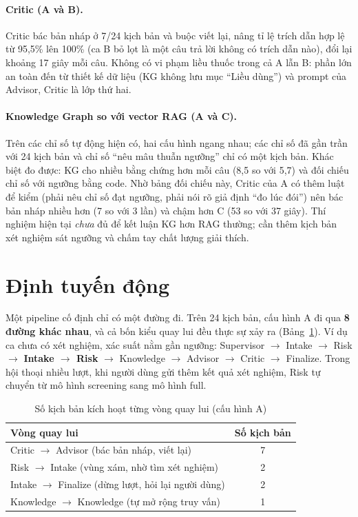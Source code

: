 \documentclass[12pt,a4paper]{report}
\begin{document}
\paragraph{Critic (A và B).} Critic bác bản nháp ở 7/24 kịch bản và buộc viết lại, nâng tỉ lệ
trích dẫn hợp lệ từ 95,5\% lên 100\% (ca B bỏ lọt là một câu trả lời không có trích dẫn nào), đổi
lại khoảng 17 giây mỗi câu. Không có vi phạm liều thuốc trong cả A lẫn B: phần lớn an toàn đến từ
thiết kế dữ liệu (KG không lưu mục ``Liều dùng'') và prompt của Advisor, Critic là lớp thứ hai.

\paragraph{Knowledge Graph so với vector RAG (A và C).} Trên các chỉ số tự động hiện có, hai cấu
hình ngang nhau; các chỉ số đã gần trần với 24 kịch bản và chỉ số ``nêu mâu thuẫn ngưỡng'' chỉ có
một kịch bản. Khác biệt đo được: KG cho nhiều bằng chứng hơn mỗi câu (8,5 so với 5,7) và đối chiếu
chỉ số với ngưỡng bằng code. Nhờ bảng đối chiếu này, Critic của A có thêm luật để kiểm (phải nêu
chỉ số đạt ngưỡng, phải nói rõ giả định ``đo lúc đói'') nên bác bản nháp nhiều hơn (7 so với 3
lần) và chậm hơn C (53 so với 37 giây). Thí nghiệm hiện tại \emph{chưa} đủ để kết luận KG hơn RAG
thường; cần thêm kịch bản xét nghiệm sát ngưỡng và chấm tay chất lượng giải thích.

\section{Định tuyến động}
\label{sec:routing}
Một pipeline cố định chỉ có một đường đi. Trên 24 kịch bản, cấu hình A đi qua \textbf{8 đường khác
nhau}, và cả bốn kiểu quay lui đều thực sự xảy ra (Bảng~\ref{tab:loops}). Ví dụ ca chưa có xét
nghiệm, xác suất nằm gần ngưỡng: Supervisor $\rightarrow$ Intake $\rightarrow$ Risk $\rightarrow$
\textbf{Intake $\rightarrow$ Risk} $\rightarrow$ Knowledge $\rightarrow$ Advisor $\rightarrow$
Critic $\rightarrow$ Finalize. Trong hội thoại nhiều lượt, khi người dùng gửi thêm kết quả xét
nghiệm, Risk tự chuyển từ mô hình screening sang mô hình full.

\begin{table}[H]
\centering
\caption{Số kịch bản kích hoạt từng vòng quay lui (cấu hình A)}
\label{tab:loops}
\begin{tabular}{lc}
\toprule
\textbf{Vòng quay lui} & \textbf{Số kịch bản} \\
\midrule
Critic $\rightarrow$ Advisor (bác bản nháp, viết lại) & 7 \\
Risk $\rightarrow$ Intake (vùng xám, nhờ tìm xét nghiệm) & 2 \\
Intake $\rightarrow$ Finalize (dừng lượt, hỏi lại người dùng) & 2 \\
Knowledge $\rightarrow$ Knowledge (tự mở rộng truy vấn) & 1 \\
\bottomrule
\end{tabular}
\end{table}
\end{document}
